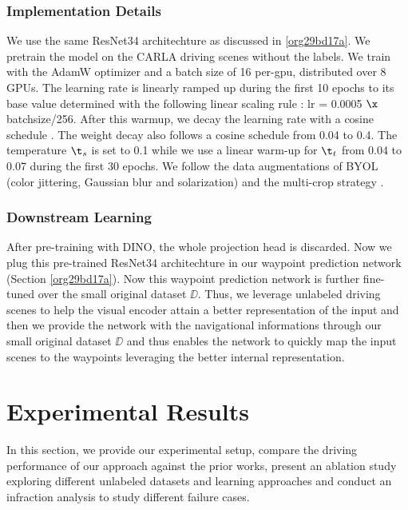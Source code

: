 \documentclass[letterpaper, 12pt]{book}
\theoremstyle{definition}
\theoremstyle{definition}
\theoremstyle{definition}
\theoremstyle{definition}
\theoremstyle{definition}
\begin{document}
\subsection{Implementation Details}
\label{sec:org6047855}
We use the same ResNet34 architechture as discussed in \ref{org29bd17a}. We pretrain the
model on the CARLA driving scenes without the labels. We train with the AdamW
optimizer \cite{Loshchilov2017} and a batch size of 16 per-gpu, distributed over
8 GPUs. The learning rate is linearly ramped up during the first 10 epochs to
its base value determined with the following linear scaling rule
\cite{Goyal2017}: lr = 0.0005 \(\x\) batchsize/256. After this warmup, we decay the
learning rate with a cosine schedule \cite{Loshchilov2016}. The weight decay
also follows a cosine schedule from 0.04 to 0.4. The temperature \(\t_{s}\) is
set to 0.1 while we use a linear warm-up for \(\t_{t}\) from 0.04 to 0.07 during
the first 30 epochs. We follow the data augmentations of BYOL \cite{Grill2020}
(color jittering, Gaussian blur and solarization) and the multi-crop strategy
\cite{Caron2020}. 

\subsection{Downstream Learning}
\label{sec:orgf4192b2}
After pre-training with DINO, the whole projection head is discarded.  Now we
plug this pre-trained ResNet34 architechture in our waypoint prediction network
(Section \ref{org29bd17a}). Now this waypoint prediction network is further fine-tuned over
the small original dataset \(\DD\). Thus, we leverage unlabeled driving scenes
to help the visual encoder attain a better representation of the input and then
we provide the network with the navigational informations through our small
original dataset \(\DD\) and thus enables the network to quickly map the input
scenes to the waypoints leveraging the better internal representation. 

\chapter{Experimental Results \label{orgaec69e1}}
\label{sec:org313b082}

In this section, we provide our experimental setup, compare the driving
performance of our approach against the prior works, present an ablation study
exploring different unlabeled datasets and learning approaches and conduct an
infraction analysis to study different failure cases.
\end{document}
